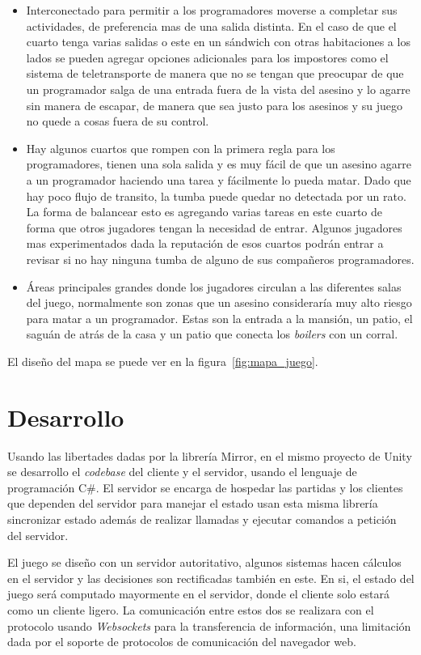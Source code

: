 \begin{itemize}
    \item Interconectado para permitir a los programadores moverse a completar sus actividades, de preferencia mas de una salida distinta. En el caso de que el cuarto tenga varias salidas o este en un sándwich con otras habitaciones a los lados se pueden agregar opciones adicionales para los impostores como el sistema de teletransporte de manera que no se tengan que preocupar de que un programador salga de una entrada fuera de la vista del asesino y lo agarre sin manera de escapar, de manera que sea justo para los asesinos y su juego no quede a cosas fuera de su control.
    \item Hay algunos cuartos que rompen con la primera regla para los programadores, tienen una sola salida y es muy fácil de que un asesino agarre a un programador haciendo una tarea y fácilmente lo pueda matar. Dado que hay poco flujo de transito, la tumba puede quedar no detectada por un rato. La forma de balancear esto es agregando varias tareas en este cuarto de forma que otros jugadores tengan la necesidad de entrar. Algunos jugadores mas experimentados dada la reputación de esos cuartos podrán entrar a revisar si no hay ninguna tumba de alguno de sus compañeros programadores.
    \item Áreas principales grandes donde los jugadores circulan a las diferentes salas del juego, normalmente son zonas que un asesino consideraría muy alto riesgo para matar a un programador. Estas son la entrada a la mansión, un patio, el saguán de atrás de la casa y un patio que conecta los \textit{boilers} con un corral.
\end{itemize}

El diseño del mapa se puede ver en la figura~\ref{fig:mapa_juego}.

\section{Desarrollo}
Usando las libertades dadas por la librería Mirror, en el mismo proyecto de Unity se desarrollo el \textit{codebase} del cliente y el servidor, usando el lenguaje de programación C\#. El servidor se encarga de hospedar las partidas y los clientes que dependen del servidor para manejar el estado usan esta misma librería sincronizar estado además de realizar llamadas y ejecutar comandos a petición del servidor.

El juego se diseño con un servidor autoritativo, algunos sistemas hacen cálculos en el servidor y las decisiones son rectificadas también en este. En si, el estado del juego será computado mayormente en el servidor, donde el cliente solo estará como un cliente ligero. La comunicación entre estos dos se realizara con el protocolo usando \textit{Websockets} para la transferencia de información, una limitación dada por el soporte de protocolos de comunicación del navegador web.

